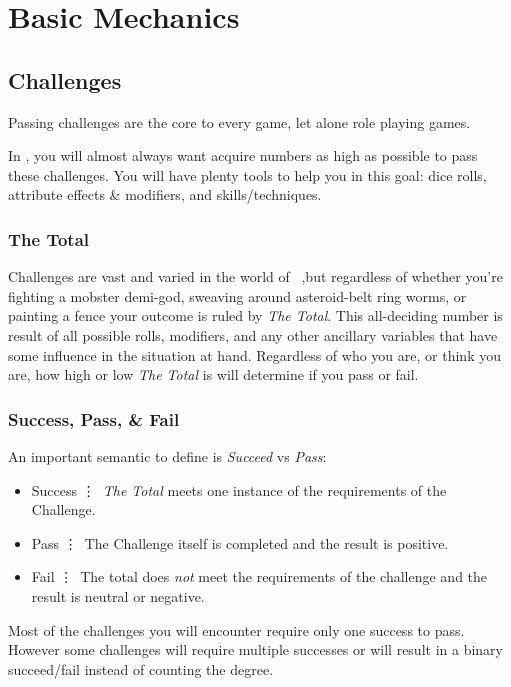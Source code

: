 \part{Basic Mechanics}\label{part:basics}
\chapter{Challenges}\label{ch:challenges}
Passing challenges are the core to every game, let alone role playing games. 

In \gametitlemini, you will almost always want acquire numbers as
high as possible to pass these challenges. You will have plenty tools
to help you in this goal: dice rolls, attribute effects \& modifiers,
and skills/techniques. 

\section{The Total}\label{sec:thetotal}
Challenges are vast and varied in the world of \gametitlemini\ ,but regardless of whether you're fighting a mobster demi-god, sweaving around asteroid-belt ring worms, or painting a fence your outcome is ruled by \emph{The Total}. This all-deciding number is result of all possible rolls, modifiers, and any other ancillary variables that have some influence in the situation at hand. Regardless of who you are, or think you are, how high or low \emph{The Total} is will determine if you pass or fail.

\section{Success, Pass, \& Fail}\label{sec:success}
An important semantic to define is \emph{Succeed} vs \emph{Pass}:

\begin{itemize}
\item Success \vdots\ \emph{The Total} meets one instance of the requirements of the Challenge.
\item Pass \vdots\ The Challenge itself is completed and the result is positive.
\item Fail \vdots\ The total does \emph{not} meet the requirements of the challenge and the result is neutral or negative.
\end{itemize}
Most of the challenges you will encounter require only one success to pass. However some challenges will require multiple successes or will result in a binary succeed/fail instead of counting the degree.

